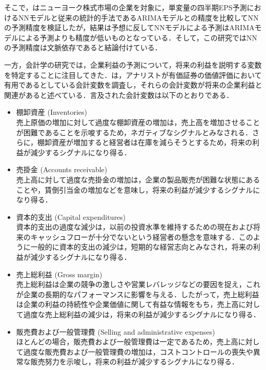 \documentclass[a4paper，12pt]{jsarticle}
\begin{document}
そこで，\cite{callen1996neural}はニューヨーク株式市場の企業を対象に，単変量の四半期EPS予測におけるNNモデルと従来の統計的手法であるARIMAモデルとの精度を比較してNNの予測精度を検証したが，結果は予想に反してNNモデルによる予測はARIMAモデルによる予測よりも精度が低いものとなっている．そして，この研究ではNNの予測精度は文脈依存であると結論付けている．

一方，会計学の研究では，企業利益の予測について，将来の利益を説明する変数を特定することに注目してきた．\cite*{lev1993fundamental}は，アナリストが有価証券の価値評価において有用であるとしている会計変数を調査し，それらの会計変数が将来の企業利益と関連があると述べている．言及された会計変数は以下のとおりである．

\begin{itemize}
\item 棚卸資産 (Inventories) \\
    売上原価の増加に対して過度な棚卸資産の増加は，売上高を増加させることが困難であることを示唆するため，ネガティブなシグナルとみなされる．さらに，棚卸資産が増加すると経営者は在庫を減らそうとするため，将来の利益が減少するシグナルになり得る．

\item 売掛金 (Accounts receivable) \\
    売上高に対して過度な売掛金の増加は，企業の製品販売が困難な状態にあることや，賃倒引当金の増加などを意味し，将来の利益が減少するシグナルになり得る．

\item 資本的支出 (Capital expenditures) \\
    資本的支出の過度な減少は，以前の投資水準を維持するための現在および将来のキャッシュフローが十分でないという経営者の懸念を意味する．このように一般的に資本的支出の減少は，短期的な経営志向とみなされ，将来の利益が減少するシグナルになり得る．

\item 売上総利益 (Gross margin) \\
    売上総利益は企業の競争の激しさや営業レバレッジなどの要因を捉え，これが企業の長期的なパフォーマンスに影響を与える．したがって，売上総利益は企業の利益の持続性や企業価値に関して有益な情報をもち，売上高に対して過度な売上総利益の減少は，将来の利益が減少するシグナルになり得る．

\item 販売費および一般管理費 (Selling and administrative expenses) \\
    ほとんどの場合，販売費および一般管理費は一定であるため，売上高に対して過度な販売費および一般管理費の増加は，コストコントロールの喪失や異常な販売努力を示唆し，将来の利益が減少するシグナルになり得る．


\end{itemize}
\end{document}
